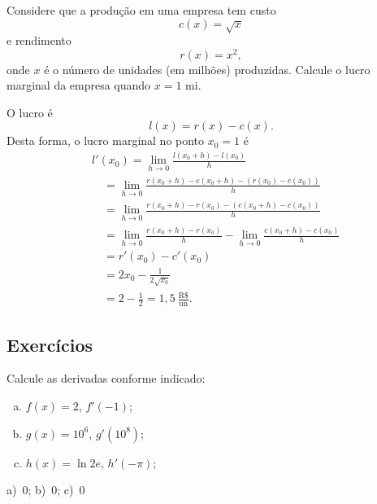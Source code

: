 \begin{exeresol}
  Considere que a produção em uma empresa tem custo
  \begin{equation}
    c(x) = \sqrt{x}
  \end{equation}
  e rendimento
  \begin{equation}
    r(x) = x^2,
  \end{equation}
  onde $x$ é o número de unidades (em milhões) produzidas. Calcule o lucro marginal da empresa quando $x=1$ mi.
\end{exeresol}
\begin{resol}
  O lucro é
  \begin{equation}
    l(x) = r(x) - c(x).
  \end{equation}
  Desta forma, o lucro marginal no ponto $x_0=1$ é
  \begin{align}
    & l'(x_0) = \lim_{h\to 0} \frac{l(x_0+h)-l(x_0)}{h}\\
    & \text{}\quad = \lim_{h\to 0} \frac{r(x_0+h)-c(x_0+h)-(r(x_0)-c(x_0))}{h}\\
    & \text{}\quad = \lim_{h\to 0} \frac{r(x_0+h)-r(x_0) - (c(x_0+h)-c(x_0))}{h}\\
    & \text{}\quad = \lim_{h\to 0} \frac{r(x_0+h)-r(x_0)}{h} - \lim_{h\to 0} \frac{c(x_0+h)-c(x_0)}{h}\\
    & \text{}\quad = r'(x_0) - c'(x_0)\\
    & \text{}\quad = 2x_0 - \frac{1}{2\sqrt{x_0}}\\
    & \text{}\quad = 2 - \frac{1}{2} = 1,5~\frac{\text{R\$}}{\text{un}}.
  \end{align}
\end{resol}


\subsection{Exercícios}

\begin{exer}
  Calcule as derivadas conforme indicado:
  \begin{enumerate}[a)]
  \item $f(x) = 2$, $f'(-1)$;
  \item $g(x) = 10^6$, $g'(10^8)$;
  \item $h(x) = \ln 2e$, $h'(-\pi)$;
  \end{enumerate}
\end{exer}
\begin{resp}
  a)~$0$; b)~$0$; c)~$0$
\end{resp}

